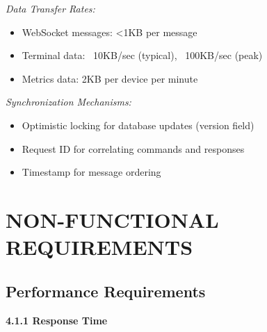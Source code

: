 \documentclass[12pt,a4paper]{article}
\begin{document}
\textit{Data Transfer Rates:}
\begin{itemize}[noitemsep]
    \item WebSocket messages: <1KB per message
    \item Terminal data: ~10KB/sec (typical), ~100KB/sec (peak)
    \item Metrics data: 2KB per device per minute
\end{itemize}

\textit{Synchronization Mechanisms:}
\begin{itemize}[noitemsep]
    \item Optimistic locking for database updates (version field)
    \item Request ID for correlating commands and responses
    \item Timestamp for message ordering
\end{itemize}

\section{NON-FUNCTIONAL REQUIREMENTS}

\subsection{Performance Requirements}

\textbf{4.1.1 Response Time}
\end{document}
